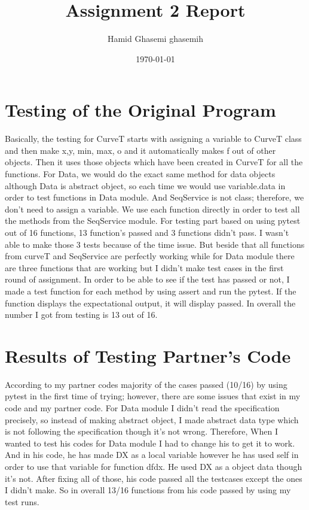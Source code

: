 \documentclass[12pt]{article}
\title{Assignment 2 Report}
\author{Hamid Ghasemi ghasemih}
\date{\today}
\begin{document}
\maketitle



\section{Testing of the Original Program}

Basically, the testing for CurveT starts with assigning a variable to CurveT class and then make x,y, min, max, o and it automatically makes f out of other objects. Then it uses those objects which have been created in CurveT for all the functions. For Data, we would do the exact same method for data objects although Data is abstract object, so each time we would use variable.data in order to test functions in Data module. And SeqService is not class; therefore, we don’t need to assign a variable. We use each function directly in order to test all the methods from the SeqService module. For testing part based on using pytest out of 16 functions, 13 function’s passed and 3 functions didn’t pass. I wasn't able to make those 3 tests because of the time issue. But beside that all functions from curveT and SeqService are perfectly working while for Data module there are three functions that are working but I didn’t make test cases in the first round of assignment. In order to be able to see if the test has passed or not, I made a test function for each method by using assert and run the pytest. If the function displays the expectational output, it will display passed. In overall the number I got from testing is 13 out of 16.

\section{Results of Testing Partner's Code}

According to my partner codes majority of the cases passed (10/16) by using pytest in the first time of trying; however, there are some issues that exist in my code and my partner code. For Data module I didn't read the specification precisely, so instead of making abstract object, I made abstract data type which is not following the specification though it’s not wrong. Therefore, When I wanted to test his codes for Data module I had to change his to get it to work. And in his code, he has made DX as a local variable however he has used self in order to use that variable for function dfdx. He used DX as a object data though it’s not. After fixing all of those, his code passed all the testcases except the ones I didn’t make. So in overall 13/16 functions from his code passed by using my test runs.
\end{document}
